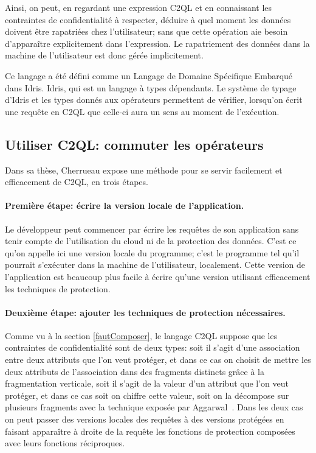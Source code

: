 Ainsi, on peut, en regardant une expression C2QL et en connaissant les
contraintes de confidentialité à respecter,
déduire à quel moment les données doivent être rapatriées chez l'utilisateur;
sans que cette opération aie besoin d'apparaître explicitement dans l'expression.
Le rapatriement des données dans la machine de l'utilisateur
est donc gérée implicitement.



Ce langage a été défini comme un Langage de Domaine Spécifique Embarqué dans
Idris. Idris, qui est un langage à types dépendants.
Le système de typage d'Idris et les types donnés aux opérateurs permettent
de vérifier, lorsqu'on écrit une requête en C2QL que celle-ci aura un sens
au moment de l'exécution.

\subsection{Utiliser C2QL: commuter les opérateurs}
\label{passage}
Dans sa thèse, Cherrueau expose une méthode pour se servir facilement
et efficacement de C2QL, en trois étapes.

\paragraph{Première étape: écrire la version locale de l'application.}
Le développeur peut commencer par écrire les requêtes de son application
sans tenir compte de l'utilisation du cloud ni de la protection
des données. C'est ce qu'on appelle ici une version \og locale \fg{}
du programme; c'est le programme tel qu'il pourrait s'exécuter dans la machine de l'utilisateur, localement.
Cette version de l'application est beaucoup plus facile à écrire 
qu'une version utilisant efficacement les techniques de protection.

\paragraph{Deuxième étape: ajouter les techniques de protection nécessaires.}
Comme vu à la section \ref{fautComposer}, le langage C2QL suppose que les contraintes de confidentialité sont de deux types:
soit il s'agit d'une association entre deux attributs que l'on veut 
protéger, et dans ce cas on choisit de mettre les deux attributs de l'association
dans des fragments distincts grâce à la fragmentation verticale, soit il s'agit de la
valeur d'un attribut que l'on veut protéger, et dans ce cas soit on chiffre cette valeur,
soit on la décompose sur plusieurs fragments avec la technique exposée par Aggarwal~\cite{aggar}. Dans les deux cas on peut passer des 
versions locales des requêtes à des versions protégées en faisant apparaître 
à droite de la requête les fonctions de protection composées avec leurs fonctions réciproques.


